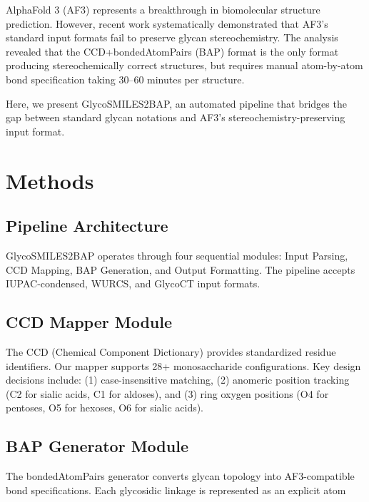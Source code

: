 \documentclass[11pt,a4paper]{article}
\begin{document}
AlphaFold 3 (AF3) represents a breakthrough in biomolecular structure prediction. However, recent work systematically demonstrated that AF3's standard input formats fail to preserve glycan stereochemistry. The analysis revealed that the CCD+bondedAtomPairs (BAP) format is the only format producing stereochemically correct structures, but requires manual atom-by-atom bond specification taking 30--60 minutes per structure.

Here, we present GlycoSMILES2BAP, an automated pipeline that bridges the gap between standard glycan notations and AF3's stereochemistry-preserving input format.

\section{Methods}

\subsection{Pipeline Architecture}

GlycoSMILES2BAP operates through four sequential modules: Input Parsing, CCD Mapping, BAP Generation, and Output Formatting. The pipeline accepts IUPAC-condensed, WURCS, and GlycoCT input formats.

\subsection{CCD Mapper Module}

The CCD (Chemical Component Dictionary) provides standardized residue identifiers. Our mapper supports 28+ monosaccharide configurations. Key design decisions include: (1) case-insensitive matching, (2) anomeric position tracking (C2 for sialic acids, C1 for aldoses), and (3) ring oxygen positions (O4 for pentoses, O5 for hexoses, O6 for sialic acids).

\subsection{BAP Generator Module}

The bondedAtomPairs generator converts glycan topology into AF3-compatible bond specifications. Each glycosidic linkage is represented as an explicit atom
\end{document}
